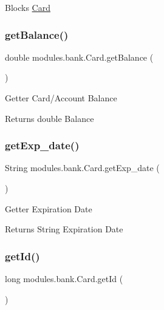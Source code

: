 Blocks \mbox{\hyperlink{classmodules_1_1bank_1_1_card}{Card}} \mbox{\label{classmodules_1_1bank_1_1_card_a62067906bc5ee5295a3e141cd4e9b9e8}} 
\subsubsection{\texorpdfstring{get\+Balance()}{getBalance()}}
{\footnotesize\ttfamily double modules.\+bank.\+Card.\+get\+Balance (\begin{DoxyParamCaption}{ }\end{DoxyParamCaption})\hspace{0.3cm}{\ttfamily [inline]}}

Getter Card/\+Account Balance \begin{DoxyReturn}{Returns}
double Balance 
\end{DoxyReturn}
\mbox{\label{classmodules_1_1bank_1_1_card_a4a06523d1698faecc6fb2f2c2345f810}} 
\subsubsection{\texorpdfstring{get\+Exp\+\_\+date()}{getExp\_date()}}
{\footnotesize\ttfamily String modules.\+bank.\+Card.\+get\+Exp\+\_\+date (\begin{DoxyParamCaption}{ }\end{DoxyParamCaption})\hspace{0.3cm}{\ttfamily [inline]}}

Getter Expiration Date \begin{DoxyReturn}{Returns}
String Expiration Date 
\end{DoxyReturn}
\mbox{\label{classmodules_1_1bank_1_1_card_a91869b7c3dad648eb2470f27b0bb8a26}} 
\subsubsection{\texorpdfstring{get\+Id()}{getId()}}
{\footnotesize\ttfamily long modules.\+bank.\+Card.\+get\+Id (\begin{DoxyParamCaption}{ }\end{DoxyParamCaption})\hspace{0.3cm}{\ttfamily [inline]}}

